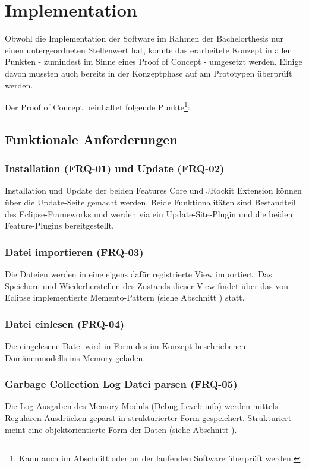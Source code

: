 \chapter{Implementation}\label{implementation}
Obwohl die Implementation der Software im Rahmen der Bachelorthesis nur einen untergeordneten Stellenwert hat, konnte das erarbeitete Konzept in allen Punkten - zumindest im Sinne eines Proof of Concept - umgesetzt werden. Einige davon mussten auch bereits in der Konzeptphase auf am Prototypen überprüft werden.

Der Proof of Concept beinhaltet folgende Punkte\footnote{Kann auch im Abschnitt  oder an der laufenden Software überprüft werden.}:
\section{Funktionale Anforderungen}
\subsection{Installation (FRQ-01) und Update (FRQ-02)}
Installation und Update der beiden Features Core und JRockit Extension können über die Update-Seite gemacht werden. Beide Funktionalitäten sind Bestandteil des Eclipse-Frameworks und werden via ein Update-Site-Plugin und die beiden Feature-Plugins bereitgestellt.

\subsection{Datei importieren (FRQ-03)}
Die Dateien werden in eine eigens dafür registrierte View importiert. Das Speichern und Wiederherstellen des Zustands dieser View findet über das von Eclipse implementierte Memento-Pattern (siehe Abschnitt ) statt. 

\subsection{Datei einlesen (FRQ-04)}
Die eingelesene Datei wird in Form des im Konzept beschriebenen Domänenmodells ins Memory geladen. 

\subsection{Garbage Collection Log Datei parsen (FRQ-05)}
Die Log-Ausgaben des Memory-Moduls (Debug-Level: info) werden mittels Regulären Ausdrücken geparst in strukturierter Form gespeichert. Strukturiert meint eine objektorientierte Form der Daten (siehe Abschnitt ).

